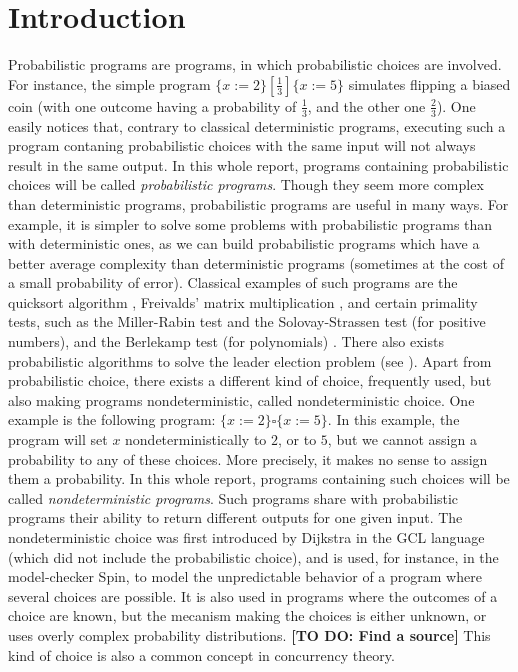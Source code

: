 \documentclass[a4paper,10pt]{llncs}
\newcommand\todo[1]{{\color{red}\textbf{[TO DO:  #1]}}}
\begin{document}
\section{Introduction}
\label{sec:intro}
Probabilistic programs are programs, in which probabilistic choices are involved. For instance, the simple program $\{ x := 2 \} [\frac{1}{3}] \{ x := 5 \}$ simulates flipping a biased coin (with one outcome having a probability of $\frac{1}{3}$, and the other one $\frac{2}{3}$). One easily notices that, contrary to classical deterministic programs, executing such a program contaning probabilistic choices with the same input will not always result in the same output. In this whole report, programs containing probabilistic choices will be called \emph{probabilistic programs}. Though they seem more complex than deterministic programs, probabilistic programs are useful in many ways. For example, it is simpler to solve some problems with probabilistic programs than with deterministic ones, as we can build probabilistic programs which have a better average complexity than deterministic programs (sometimes at the cost of a small probability of error). Classical examples of such programs are the quicksort algorithm \cite{Hoare61}, Freivalds' matrix multiplication \cite{Freivalds77}, and certain primality tests, such as the Miller-Rabin test \cite{Rabin77} and the Solovay-Strassen test \cite{SolovayStrassen77} (for positive numbers), and the Berlekamp test (for polynomials) \cite{Berlekamp67}. There also exists probabilistic algorithms to solve the leader election problem (see \cite{Ramanathan04}).\newline 
Apart from probabilistic choice, there exists a different kind of choice, frequently used, but also making programs nondeterministic, called nondeterministic choice. One example is the following program: $\{ x := 2 \} \square \{ x := 5 \}$. In this example, the program will set $x$ nondeterministically to $2$, or to $5$, but we cannot assign a probability to any of these choices. More precisely, it makes no sense to assign them a probability. In this whole report, programs containing such choices will be called \emph{nondeterministic programs}. Such programs share with probabilistic programs their ability to return different outputs for one given input. The nondeterministic choice was first introduced by Dijkstra in the GCL language \cite{Dijkstra76} (which did not include the probabilistic choice), and is used, for instance, in the model-checker Spin, to model the unpredictable behavior of a program where several choices are possible. It is also used in programs where the outcomes of a choice are known, but the mecanism making the choices is either unknown, or uses overly complex probability distributions. \todo{Find a source} This kind of choice is also a common concept in concurrency theory.\bigskip
\end{document}
